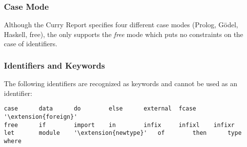 \subsubsection{Case Mode}

Although the Curry Report specifies four different case modes
(Prolog, G\"odel, Haskell, free),
the \CYS only supports the \emph{free} mode
which puts no constraints on the case of identifiers.

\subsubsection{Identifiers and Keywords}

\begin{grammar}



\end{grammar}

The following identifiers are recognized as keywords
and cannot be used as an identifier:
\begin{lstlisting}[escapechar=']
case      data      do        else      external  fcase     '\extension{foreign}'
free      if        import    in        infix     infixl    infixr
let       module    '\extension{newtype}'   of        then      type      where
\end{lstlisting}

